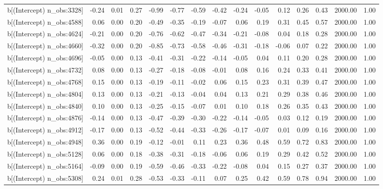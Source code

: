 \begin{table}[ht]
\begin{tabular}{rrrrrrrrrrrrrrr}
  b[(Intercept) n\_obs:3328] & -0.24 & 0.01 & 0.27 & -0.99 & -0.77 & -0.59 & -0.42 & -0.24 & -0.05 & 0.12 & 0.26 & 0.43 & 2000.00 & 1.00 \\ 
  b[(Intercept) n\_obs:4588] & 0.06 & 0.00 & 0.20 & -0.49 & -0.35 & -0.19 & -0.07 & 0.06 & 0.19 & 0.31 & 0.45 & 0.57 & 2000.00 & 1.00 \\ 
  b[(Intercept) n\_obs:4624] & -0.21 & 0.00 & 0.20 & -0.76 & -0.62 & -0.47 & -0.34 & -0.21 & -0.08 & 0.04 & 0.18 & 0.28 & 2000.00 & 1.00 \\ 
  b[(Intercept) n\_obs:4660] & -0.32 & 0.00 & 0.20 & -0.85 & -0.73 & -0.58 & -0.46 & -0.31 & -0.18 & -0.06 & 0.07 & 0.22 & 2000.00 & 1.00 \\ 
  b[(Intercept) n\_obs:4696] & -0.05 & 0.00 & 0.13 & -0.41 & -0.31 & -0.22 & -0.14 & -0.05 & 0.04 & 0.11 & 0.20 & 0.28 & 2000.00 & 1.00 \\ 
  b[(Intercept) n\_obs:4732] & 0.08 & 0.00 & 0.13 & -0.27 & -0.18 & -0.08 & -0.01 & 0.08 & 0.16 & 0.24 & 0.33 & 0.41 & 2000.00 & 1.00 \\ 
  b[(Intercept) n\_obs:4768] & 0.15 & 0.00 & 0.13 & -0.19 & -0.11 & -0.02 & 0.06 & 0.15 & 0.23 & 0.31 & 0.39 & 0.47 & 2000.00 & 1.00 \\ 
  b[(Intercept) n\_obs:4804] & 0.13 & 0.00 & 0.13 & -0.21 & -0.13 & -0.04 & 0.04 & 0.13 & 0.21 & 0.29 & 0.38 & 0.46 & 2000.00 & 1.00 \\ 
  b[(Intercept) n\_obs:4840] & 0.10 & 0.00 & 0.13 & -0.25 & -0.15 & -0.07 & 0.01 & 0.10 & 0.18 & 0.26 & 0.35 & 0.43 & 2000.00 & 1.00 \\ 
  b[(Intercept) n\_obs:4876] & -0.14 & 0.00 & 0.13 & -0.47 & -0.39 & -0.30 & -0.22 & -0.14 & -0.05 & 0.03 & 0.12 & 0.19 & 2000.00 & 1.00 \\ 
  b[(Intercept) n\_obs:4912] & -0.17 & 0.00 & 0.13 & -0.52 & -0.44 & -0.33 & -0.26 & -0.17 & -0.07 & 0.01 & 0.09 & 0.16 & 2000.00 & 1.00 \\ 
  b[(Intercept) n\_obs:4948] & 0.36 & 0.00 & 0.19 & -0.12 & -0.01 & 0.11 & 0.23 & 0.36 & 0.48 & 0.59 & 0.72 & 0.83 & 2000.00 & 1.00 \\ 
  b[(Intercept) n\_obs:5128] & 0.06 & 0.00 & 0.18 & -0.38 & -0.31 & -0.18 & -0.06 & 0.06 & 0.19 & 0.29 & 0.42 & 0.52 & 2000.00 & 1.00 \\ 
  b[(Intercept) n\_obs:5164] & -0.09 & 0.00 & 0.19 & -0.59 & -0.46 & -0.33 & -0.22 & -0.08 & 0.04 & 0.15 & 0.27 & 0.37 & 2000.00 & 1.00 \\ 
  b[(Intercept) n\_obs:5308] & 0.24 & 0.01 & 0.28 & -0.53 & -0.33 & -0.11 & 0.07 & 0.25 & 0.42 & 0.59 & 0.78 & 0.94 & 2000.00 & 1.00 \\ 

\end{tabular}
\end{table}
